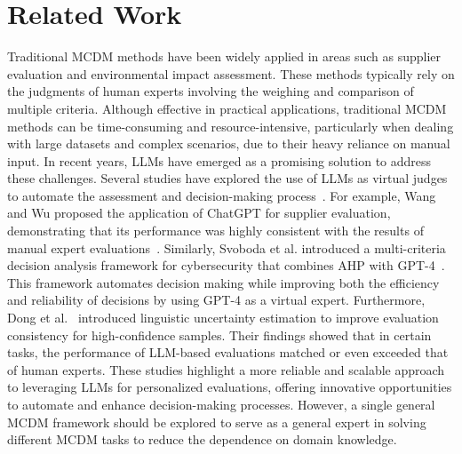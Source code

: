 \section{Related Work}
Traditional MCDM methods have been widely applied in areas such as supplier evaluation and environmental impact assessment. These methods typically rely on the judgments of human experts involving the weighing and comparison of multiple criteria. Although effective in practical applications, traditional MCDM methods can be time-consuming and resource-intensive, particularly when dealing with large datasets and complex scenarios, due to their heavy reliance on manual input. In recent years, LLMs have emerged as a promising solution to address these challenges. Several studies have explored the use of LLMs as virtual judges to automate the assessment and decision-making process~\cite{30-li2024generation,33-pasch2025llm,34-bennie2025panda}. For example, Wang and Wu proposed the application of ChatGPT for supplier evaluation, demonstrating that its performance was highly consistent with the results of manual expert evaluations~\cite{14-wang2024can}. Similarly, Svoboda et al. introduced a multi-criteria decision analysis framework for cybersecurity that combines AHP with GPT-4~\cite{31-svoboda2024enhancing}. This framework automates decision making while improving both the efficiency and reliability of decisions by using GPT-4 as a virtual expert. Furthermore, Dong et al.~\cite{32-dong2024can} introduced linguistic uncertainty estimation to improve evaluation consistency for high-confidence samples. Their findings showed that in certain tasks, the performance of LLM-based evaluations matched or even exceeded that of human experts. These studies highlight a more reliable and scalable approach to leveraging LLMs for personalized evaluations, offering innovative opportunities to automate and enhance decision-making processes. However, a single general MCDM framework should be explored to serve as a general expert in solving different MCDM tasks to reduce the dependence on domain knowledge.